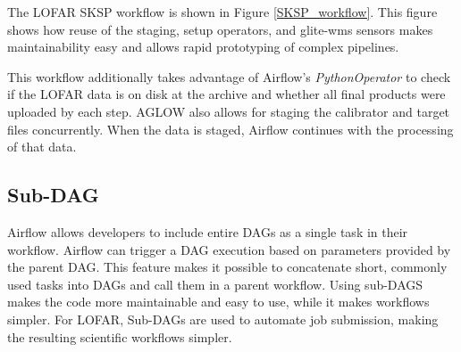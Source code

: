 \begin{subappendices}
The LOFAR SKSP workflow is shown in Figure \ref{SKSP_workflow}. This figure shows how reuse of the staging, setup operators, and glite-wms sensors makes maintainability easy and allows rapid prototyping of complex pipelines. 
 
 This workflow additionally takes advantage of Airflow's \textit{PythonOperator} to check if the LOFAR data is on disk at the archive and whether all final products were uploaded by each step. AGLOW also allows for staging the calibrator and target files concurrently. When the data is staged, Airflow continues with the processing of that data. 

\subsection{Sub-DAG}\label{sec:Subdags}
Airflow allows developers to include entire DAGs as a single task in their workflow. Airflow can trigger a DAG execution based on parameters provided by the parent DAG. This feature makes it possible to concatenate short, commonly used tasks into DAGs and call them in a parent workflow. Using sub-DAGS makes the code more maintainable and easy to use, while it makes workflows simpler. For LOFAR, Sub-DAGs are used to automate job submission, making the resulting scientific workflows simpler. 

   
\end{subappendices}


















